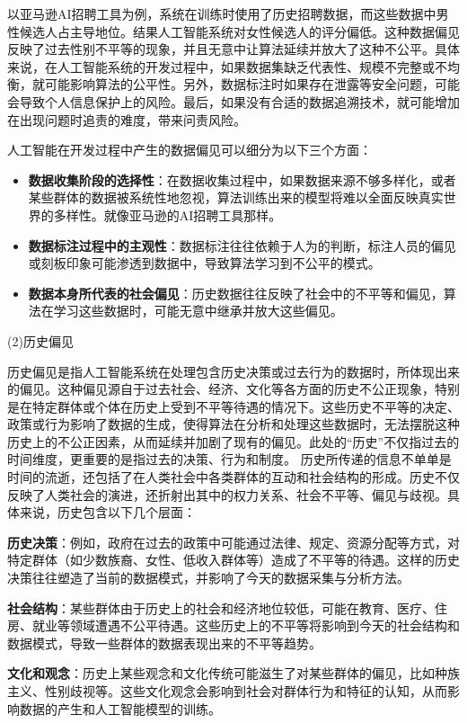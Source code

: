 以亚马逊AI招聘工具为例，系统在训练时使用了历史招聘数据，而这些数据中男性候选人占主导地位。结果人工智能系统对女性候选人的评分偏低。这种数据偏见反映了过去性别不平等的现象，并且无意中让算法延续并放大了这种不公平。具体来说，在人工智能系统的开发过程中，如果数据集缺乏代表性、规模不完整或不均衡，就可能影响算法的公平性。另外，数据标注时如果存在泄露等安全问题，可能会导致个人信息保护上的风险。最后，如果没有合适的数据追溯技术，就可能增加在出现问题时追责的难度，带来问责风险。

人工智能在开发过程中产生的数据偏见可以细分为以下三个方面：
\begin{itemize}
\item \textbf{数据收集阶段的选择性}：在数据收集过程中，如果数据来源不够多样化，或者某些群体的数据被系统性地忽视，算法训练出来的模型将难以全面反映真实世界的多样性。就像亚马逊的AI招聘工具那样。
\item \textbf{数据标注过程中的主观性}：数据标注往往依赖于人为的判断，标注人员的偏见或刻板印象可能渗透到数据中，导致算法学习到不公平的模式。
\item \textbf{数据本身所代表的社会偏见}：历史数据往往反映了社会中的不平等和偏见，算法在学习这些数据时，可能无意中继承并放大这些偏见。
\end{itemize}
(2)历史偏见

历史偏见是指人工智能系统在处理包含历史决策或过去行为的数据时，所体现出来的偏见。这种偏见源自于过去社会、经济、文化等各方面的历史不公正现象，特别是在特定群体或个体在历史上受到不平等待遇的情况下。这些历史不平等的决定、政策或行为影响了数据的生成，使得算法在分析和处理这些数据时，无法摆脱这种历史上的不公正因素，从而延续并加剧了现有的偏见。此处的“历史”不仅指过去的时间维度，更重要的是指过去的决策、行为和制度。 历史所传递的信息不单单是时间的流逝，还包括了在人类社会中各类群体的互动和社会结构的形成。历史不仅反映了人类社会的演进，还折射出其中的权力关系、社会不平等、偏见与歧视。具体来说，历史包含以下几个层面：

\textbf{历史决策}：例如，政府在过去的政策中可能通过法律、规定、资源分配等方式，对特定群体（如少数族裔、女性、低收入群体等）造成了不平等的待遇。这样的历史决策往往塑造了当前的数据模式，并影响了今天的数据采集与分析方法。

\textbf{社会结构}：某些群体由于历史上的社会和经济地位较低，可能在教育、医疗、住房、就业等领域遭遇不公平待遇。这些历史上的不平等将影响到今天的社会结构和数据模式，导致一些群体的数据表现出来的不平等趋势。

\textbf{文化和观念}：历史上某些观念和文化传统可能滋生了对某些群体的偏见，比如种族主义、性别歧视等。这些文化观念会影响到社会对群体行为和特征的认知，从而影响数据的产生和人工智能模型的训练。


